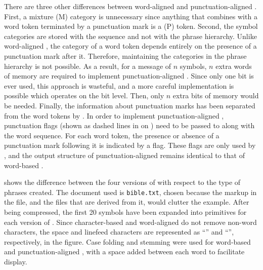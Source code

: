 There are three other differences between word-aligned
and punctuation-aligned \repair.  First, a mixture (M)
category is unnecessary since anything that combines with
a word token terminated by a punctuation mark is a
(P) token.  Second, the symbol
categories are stored with the sequence and not with the
phrase hierarchy.  Unlike word-aligned \repair, the
category of a word token depends entirely on the
presence of a punctuation mark after it.  Therefore,
maintaining the categories in the phrase hierarchy
is not possible.  As a result, for a message of 
$n$ symbols, $n$ extra words of memory are required
to implement punctuation-aligned \repair.  Since only one
bit is ever used, this approach is wasteful, and a more
careful implementation is possible which operates on 
the bit level.  Then, only $n$ extra bits of memory would
be needed.
Finally, the information about punctuation marks
has been separated from the word tokens by \prepair.
In order to implement punctuation-aligned \repair, 
punctuation flags (shown as dashed lines in
 on 
) need to be passed
to \repair along with the word sequence.  For each
word token, the presence or absence of a punctuation 
mark following it is indicated by a flag.  These flags are
only used by \repair, and the output structure of 
punctuation-aligned \repair
remains identical to that of word-based \repair.

 shows the
difference between the four versions of \repair with respect to
the type of phrases created.  The document used is 
{\texttt {bible.txt}}, chosen because the \sgml markup in the 
\news file, and the files that are derived from it, would clutter
the example.  After being compressed, the first 20 symbols
have been expanded into primitives for each version
of \repair.  Since character-based and word-aligned \repair 
do not remove non-word characters, the space and linefeed characters
are represented as ``\tvs'' and ``\tb'', respectively, in the figure.
Case folding and stemming were used for word-based 
and punctuation-aligned \repair, with a space added between 
each word to facilitate display.

